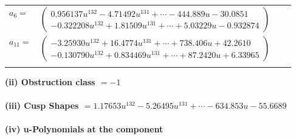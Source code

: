 \documentclass[1p]{elsarticle_modified}
\theoremstyle{definition}
\begin{document}
\begin{tabular}{m{7pt} m{180pt} m{7pt} m{180pt} }
\flushright $a_{6}=$&$\begin{pmatrix}0.956137 u^{132}-4.71492 u^{131}+\cdots-444.889 u-30.0851\\-0.322208 u^{132}+1.81509 u^{131}+\cdots+5.03229 u-0.932874\end{pmatrix}$ \\
\flushright $a_{11}=$&$\begin{pmatrix}-3.25930 u^{132}+16.4774 u^{131}+\cdots+738.406 u+42.2610\\-0.130790 u^{132}+0.834469 u^{131}+\cdots+87.2420 u+6.33965\end{pmatrix}$\\&\end{tabular}
\flushleft \textbf{(ii) Obstruction class $= -1$}\\~\\
\flushleft \textbf{(iii) Cusp Shapes $= 1.17653 u^{132}-5.26495 u^{131}+\cdots-634.853 u-55.6689$}\\~\\
\newpage\renewcommand{\arraystretch}{1}
\flushleft \textbf{(iv) u-Polynomials at the component}\newline \\
\end{document}
